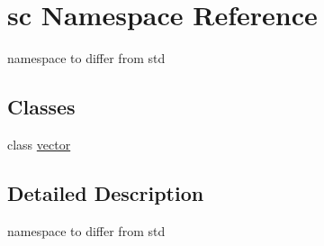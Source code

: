 \hypertarget{namespacesc}{}\section{sc Namespace Reference}
\label{namespacesc}


namespace to differ from std  


\subsection*{Classes}
\begin{DoxyCompactItemize}
\item 
class \hyperlink{classsc_1_1vector}{vector}
\end{DoxyCompactItemize}


\subsection{Detailed Description}
namespace to differ from std 